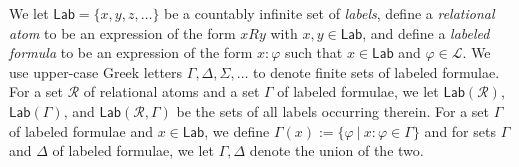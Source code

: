 \documentclass[copyright,creativecommons]{eptcs}
\newcommand{\rel}{\mathcal{R}}
\renewcommand{\phi}{\varphi}
\newcommand{\lab}{\mathsf{Lab}}
\newcommand{\lang}{\mathscr{L}}
\begin{document}
We let $\lab = \{x, y, z, \ldots\}$ be a countably infinite set of \emph{labels}, define a \emph{relational atom} to be an expression of the form $xRy$ with $x,y \in \lab$, and define a \emph{labeled formula} to be an expression of the form $x : \phi$ such that $x \in \lab$ and $\phi \in \lang$. We use upper-case Greek letters $\Gamma, \Delta, \Sigma, \ldots$ to denote finite sets of labeled formulae. For a set $\rel$ of relational atoms and a set $\Gamma$ of labeled formulae, we let $\lab(\rel)$, $\lab(\Gamma)$, and $\lab(\rel,\Gamma)$ be the sets of all labels occurring therein. For a set $\Gamma$ of labeled formulae and $x \in \lab$, we define $\Gamma(x) := \{\phi \ | \ x : \phi \in \Gamma\}$ %
and for sets $\Gamma$ and $\Delta$ of labeled formulae, we let $\Gamma, \Delta$ denote the union of the two.
\end{document}
